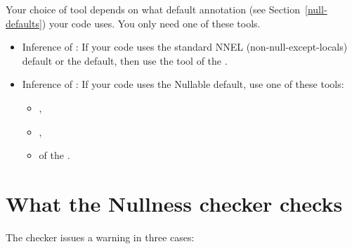 Your choice of tool depends on what default annotation (see
Section~\ref{null-defaults}) your code uses.  You only need one of these tools.

\begin{itemize}

\item
  Inference of :
  If your code uses the standard NNEL (non-null-except-locals) default or
  the  default, then use the
  tool of the .

\item
  Inference of :
  If your code uses the Nullable default, use one of these tools:
\begin{itemize}
\item
  ,
\item
  ,
\item
   of the .
\end{itemize}

\end{itemize}



\section{What the Nullness checker checks\label{nullness-checks}}

The checker issues a warning in three cases:

